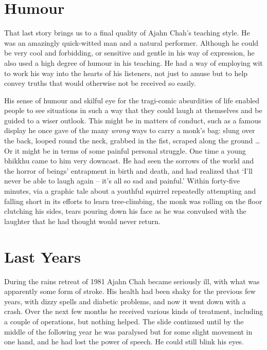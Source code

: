 \section{Humour}

That last story brings us to a final quality of Ajahn Chah's teaching style. He was an amazingly quick-witted man and a natural performer. Although he could be very cool and forbidding, or sensitive and gentle in his way of expression, he also used a high degree of humour in his teaching. He had a way of employing wit to work his way into the hearts of his listeners, not just to amuse but to help convey truths that would otherwise not be received so easily.

His sense of humour and skilful eye for the tragi-comic absurdities of life enabled people to see situations in such a way that they could laugh at themselves and be guided to a wiser outlook. This might be in matters of conduct, such as a famous display he once gave of the many \textit{wrong} ways to carry a monk's bag: slung over the back, looped round the neck, grabbed in the fist, scraped along the ground \ldots{} Or it might be in terms of some painful personal struggle. One time a young bhikkhu came to him very downcast. He had seen the sorrows of the world and the horror of beings' entrapment in birth and death, and had realized that `I'll never be able to laugh again -- it's all so sad and painful.' Within forty-five minutes, via a graphic tale about a youthful squirrel repeatedly attempting and falling short in its efforts to learn tree-climbing, the monk was rolling on the floor clutching his sides, tears pouring down his face as he was convulsed with the laughter that he had thought would never return.
\vspace*{0.4\baselineskip}

\section{Last Years}

\vspace*{0.4\baselineskip}
During the rains retreat of 1981 Ajahn Chah became seriously ill, with what was apparently some form of stroke. His health had been shaky for the previous few years, with dizzy spells and diabetic problems, and now it went down with a crash. Over the next few months he received various kinds of treatment, including a couple of operations, but nothing helped. The slide continued until by the middle of the following year he was paralysed but for some slight movement in one hand, and he had lost the power of speech. He could still blink his eyes.

